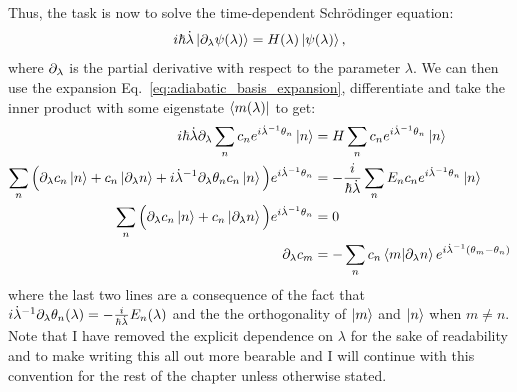     Thus, the task is now to solve the time-dependent Schr\"{o}dinger equation:
    \begin{equation}\label{eq:td-schroedinger}
        i\hbar \dot{\lambda} \ket{\partial_{\lambda} \psi(\lambda)} = H(\lambda) \ket{\psi(\lambda)},
    \end{equation}
    where $\partial_{\lambda}$ is the partial derivative with respect to the parameter $\lambda$. We can then use the expansion Eq.~\eqref{eq:adiabatic_basis_expansion}, differentiate and take the inner product with some eigenstate $\bra{m(\lambda)}$ to get:
    \begin{equation}\label{eq:adiabatic_derivation}
        \begin{aligned}
         i\hbar \dot{\lambda} \partial_{\lambda} \sum_n c_n e^{i \dot{\lambda}^{-1} \theta_n} \ket{n} &= H \sum_n c_n e^{i \dot{\lambda}^{-1} \theta_n} \ket{n} \\
        \sum_n \Big( \partial_{\lambda} c_n \ket{n} + c_n \ket{\partial_{\lambda} n} + i \dot{\lambda}^{-1} \partial_{\lambda}\theta_n c_n \ket{n} \Big)e^{i \dot{\lambda}^{-1} \theta_n} &= -\frac{i}{\hbar \dot{\lambda}} \sum_n E_n c_n e^{i \dot{\lambda}^{-1} \theta_n} \ket{n} \\
        \sum_n \Big( \partial_{\lambda} c_n \ket{n} + c_n \ket{\partial_{\lambda} n} \Big)e^{i \dot{\lambda}^{-1} \theta_n} &= 0 \\
        \partial_{\lambda} c_m  &= - \sum_n c_n \braket{m}{\partial_{\lambda} n}e^{i\dot{\lambda}^{-1}(\theta_m-\theta_n)}
        \end{aligned}
    \end{equation}
    where the last two lines are a consequence of the fact that $i \dot{\lambda}^{-1} \partial_{\lambda} \theta_n(\lambda) = -\frac{i}{\hbar \dot{\lambda}} E_n(\lambda)$ and the the orthogonality of $\ket{m}$ and $\ket{n}$ when $m \neq n$. Note that I have removed the explicit dependence on $\lambda$ for the sake of readability and to make writing this all out more bearable and I will continue with this convention for the rest of the chapter unless otherwise stated. 
    
